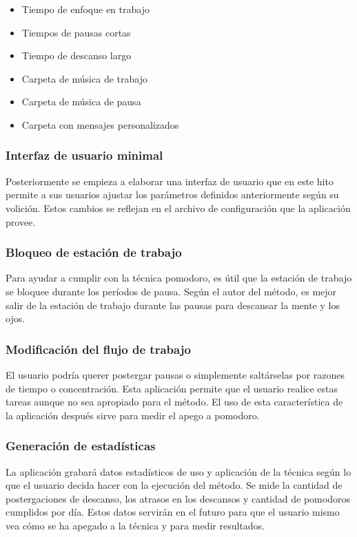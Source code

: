 \documentclass[12pt,letterpaper]{report}
\providecommand{\tightlist}{%
  \setlength{\itemsep}{0pt}\setlength{\parskip}{0pt}}
\begin{document}
\begin{itemize}\tightlist{}
  \item Tiempo de enfoque en trabajo
  \item Tiempos de pausas cortas
  \item Tiempo de descanso largo
  \item Carpeta de música de trabajo
  \item Carpeta de música de pausa
  \item Carpeta con mensajes personalizados
\end{itemize}

\subsubsection{Interfaz de usuario minimal}

Posteriormente se empieza a elaborar una interfaz de usuario que en este hito permite a sus usuarios ajustar los
parámetros definidos anteriormente según su volición. Estos cambios se reflejan en el archivo de configuración que la
aplicación provee.

\subsubsection{Bloqueo de estación de trabajo}

Para ayudar a cumplir con la técnica pomodoro, es útil que la estación de trabajo se bloquee durante los períodos de
pausa. Según el autor del método, es mejor salir de la estación de trabajo durante las pausas para descansar la mente y
los ojos.

\subsubsection{Modificación del flujo de trabajo}

El usuario podría querer postergar pausas o simplemente saltárselas por razones de tiempo o concentración. Esta
aplicación permite que el usuario realice estas tareas aunque no sea apropiado para el método. El uso de esta
característica de la aplicación después sirve para medir el apego a pomodoro.

\subsubsection{Generación de estadísticas}

La aplicación grabará datos estadísticos de uso y aplicación de la técnica según lo que el usuario decida hacer con la
ejecución del método. Se mide la cantidad de postergaciones de descanso, los atrasos en los descansos y cantidad de
pomodoros cumplidos por día. Estos datos servirán en el futuro para que el usuario mismo vea cómo se ha apegado a la
técnica y para medir resultados.
\end{document}
